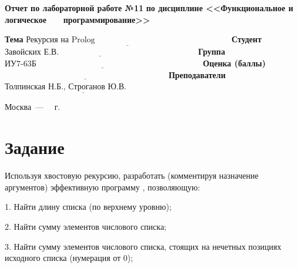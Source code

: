 \documentclass[12pt]{report}
\begin{document}
\begin{titlepage}
		\begin{center}
			\noindent\begin{minipage}{1.1\textwidth}\centering
				\Large\textbf{  Отчет по лабораторной работе №11}\newline
				\textbf{по дисциплине <<Функциональное и логическое}\newline
				\textbf{~~~программирование>>}\newline\newline
			\end{minipage}
		\end{center}
		
		\noindent\textbf{Тема} $\underline{\text{Рекурсия на Prolog~~~~~~~~~~~~~~~~~~~~~~~~~~~~~~~~~~~~~~~~~~~~~~~~~}}$\newline\newline
		\noindent\textbf{Студент} $\underline{\text{Завойских Е.В.~~~~~~~~~~~~~~~~~~~~~~~~~~~~~~~~~~~~~~~~~~~~~~~~~~}}$\newline\newline
		\noindent\textbf{Группа} $\underline{\text{ИУ7-63Б~~~~~~~~~~~~~~~~~~~~~~~~~~~~~~~~~~~~~~~~~~~~~~~~~~~~~~~~~~~~}}$\newline\newline
		\noindent\textbf{Оценка (баллы)} $\underline{\text{~~~~~~~~~~~~~~~~~~~~~~~~~~~~~~~~~~~~~~~~~~~~~~~~~~~~~~~~~~~}}$\newline\newline
		\noindent\textbf{Преподаватели} $\underline{\text{Толпинская Н.Б., Строганов Ю.В.~~~~~~~~~~~~~}}$\newline\newline\newline
		
		\begin{center}
			\vfill
			Москва~---~\the\year
			~г.
		\end{center}
	\end{titlepage}
		

\section*{Задание}

Используя хвостовую рекурсию, разработать (комментируя назначение
аргументов) эффективную программу , позволяющую:

1. Найти длину списка (по верхнему уровню);

2. Найти сумму элементов числового списка;

3. Найти сумму элементов числового списка, стоящих на нечетных позициях исходного списка (нумерация от 0);
\end{document}
